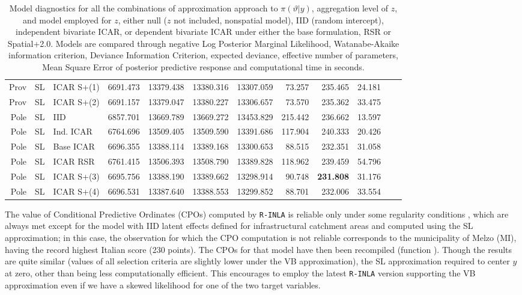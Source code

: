 \documentclass[openany]{book}
\begin{document}
\begin{appendices}
\begin{table}[ht]
{\begin{tabular}{rlllrrrrrrrr}
  Prov & SL & ICAR S+(1) & 6691.473 & 13379.438 & 13380.316 & 13307.059 & 73.257 & 235.465 & 24.181 \\ 
  Prov & SL & ICAR S+(2) & 6691.157 & 13379.047 & 13380.227 & 13306.657 & 73.570 & 235.362 & 33.475 \\ 
  Pole & SL & IID & 6857.701\footnotemark[1]  & 13669.789 & 13669.272 & 13453.829 & 215.442 & 236.662 & 13.597 \\ 
  Pole & SL & Ind. ICAR & 6764.696 & 13509.405 & 13509.590 & 13391.686 & 117.904 & 240.333 & 20.426 \\ 
  Pole & SL & Base ICAR & 6696.355 & 13388.114 & 13389.168 & 13300.653 & 88.515 & 232.351 & 31.058 \\ 
  Pole & SL & ICAR RSR & 6761.415 & 13506.393 & 13508.790 & 13389.828 & 118.962 & 239.459 & 54.796 \\ 
  Pole & SL & ICAR S+(3) & 6695.756 & 13388.190 & 13389.662 & 13298.914 & 90.748 & \textbf{231.808} & 31.176 \\  
  Pole & SL & ICAR S+(4) & 6696.531 & 13387.640 & 13388.553 & 13299.852 & 88.701 & 232.006 & 33.554 \\ 
    \bottomrule \end{tabular}
    }
\caption{Model diagnostics for all the combinations of approximation approach to $\pi(\vartheta | y)$, aggregation level of $z$, and model employed for $z$, either null ($z$ not included, nonspatial model), IID (random intercept), independent bivariate ICAR, or dependent bivariate ICAR under either the base formulation, RSR or Spatial+2.0. Models are compared through negative Log Posterior Marginal Likelihood, Watanabe-Akaike information criterion, Deviance Information Criterion, expected deviance, effective number of parameters, Mean Square Error of posterior predictive response and computational time in seconds.}
\label{tab:ICAR}
\end{table}



The value of Conditional Predictive Ordinates (CPOs) computed by \texttt{R-INLA} is reliable only under some regularity conditions \citep{CPOINLA}, which are always met except for the model with IID latent effects defined for infrastructural catchment areas and computed using the SL approximation; in this case, the observation for which the CPO computation is not reliable corresponds to the municipality of Melzo (MI), having the record highest Italian score (230 points). The CPOs for that model have then been recompiled (function \texttt{}). 
Though the results are quite similar (values of all selection criteria are slightly lower under the VB approximation), the SL approximation required to center $y$ at zero, other than being less computationally efficient. This encourages to employ the latest \texttt{R-INLA} version supporting the VB approximation even if we have a skewed likelihood for one of the two target variables.


\end{appendices}
\end{document}
